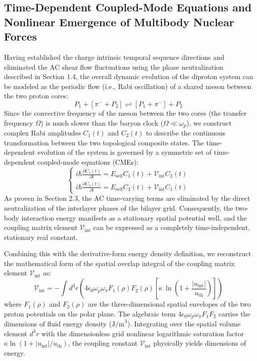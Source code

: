 \documentclass[12pt, a4paper]{article}
\begin{document}
\subsection{Time-Dependent Coupled-Mode Equations and Nonlinear Emergence of Multibody Nuclear Forces}

Having established the charge intrinsic temporal sequence directions and eliminated the AC shear flow fluctuations using the phase neutralization described in Section 1.4, the overall dynamic evolution of the diproton system can be modeled as the periodic flow (i.e., Rabi oscillation) of a shared meson between the two proton cores:
\begin{equation}
P_1 + [\pi^- + P_2] \rightleftharpoons [P_1 + \pi^-] + P_2
\end{equation}
Since the convective frequency of the meson between the two cores (the transfer frequency $\Omega$) is much slower than the baryon clock ($\Omega \ll \omega_p$), we construct complex Rabi amplitudes $C_1(t)$ and $C_2(t)$ to describe the continuous transformation between the two topological composite states. The time-dependent evolution of the system is governed by a symmetric set of time-dependent coupled-mode equations (CMEs):
\begin{equation}
\begin{cases} 
i \hbar \frac{\partial C_1(t)}{\partial t} = E_{\mathrm{self}} C_1(t) + \mathcal{V}_{\mathrm{int}} C_2(t) \\ 
i \hbar \frac{\partial C_2(t)}{\partial t} = E_{\mathrm{self}} C_2(t) + \mathcal{V}_{\mathrm{int}} C_1(t) 
\end{cases}
\end{equation}
As proven in Section 2.3, the AC time-varying terms are eliminated by the direct neutralization of the interlayer phases of the bilayer grid. Consequently, the two-body interaction energy manifests as a stationary spatial potential well, and the coupling matrix element $\mathcal{V}_{\mathrm{int}}$ can be expressed as a completely time-independent, stationary real constant.

Combining this with the derivative-form energy density definition, we reconstruct the mathematical form of the spatial overlap integral of the coupling matrix element $\mathcal{V}_{\mathrm{int}}$ as:
\begin{equation}
\mathcal{V}_{\mathrm{int}} = -\int d^3r \left( 4\epsilon_0 \omega_p \omega_\pi F_1(\rho) F_2(\rho) \left[ \kappa \, \ln \left( 1 + \frac{|u_{\mathrm{int}}|}{u_{\mathrm{th}}} \right) \right] \right)
\end{equation}
where $F_1(\rho)$ and $F_2(\rho)$ are the three-dimensional spatial envelopes of the two proton potentials on the polar plane. The algebraic term $4\epsilon_0 \omega_p \omega_\pi F_1 F_2$ carries the dimensions of fluid energy density ($\text{J/m}^3$). Integrating over the spatial volume element $d^3r$ with the dimensionless grid nonlinear logarithmic saturation factor $\kappa \ln \left( 1 + |u_{\mathrm{int}}|/u_{\mathrm{th}} \right)$, the coupling constant $\mathcal{V}_{\mathrm{int}}$ physically yields dimensions of energy.
\end{document}
